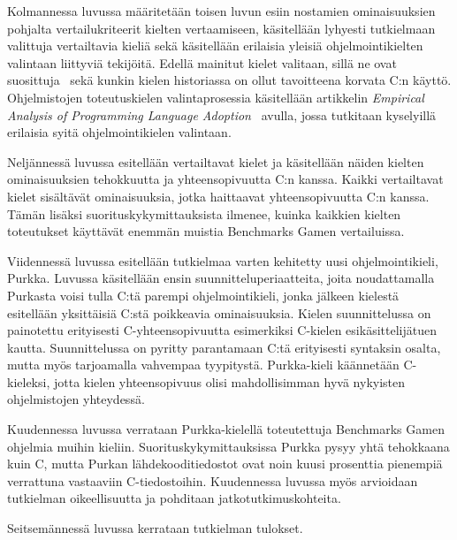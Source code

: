 Kolmannessa luvussa määritetään toisen luvun esiin nostamien ominaisuuksien
pohjalta vertailukriteerit kielten vertaamiseen, käsitellään lyhyesti
tutkielmaan valittuja vertailtavia kieliä sekä käsitellään erilaisia yleisiä
ohjelmointikielten valintaan liittyviä tekijöitä. Edellä mainitut kielet
valitaan, sillä ne ovat suosittuja~\citep{tiobe} sekä kunkin kielen historiassa
on ollut tavoitteena korvata C:n käyttö. Ohjelmistojen toteutuskielen
valintaprosessia käsitellään artikkelin \emph{Empirical Analysis of Programming
Language Adoption}~\citep{empiricalpopularity} avulla, jossa tutkitaan
kyselyillä erilaisia syitä ohjelmointikielen valintaan.

Neljännessä luvussa esitellään vertailtavat kielet ja käsitellään näiden
kielten ominaisuuksien tehokkuutta ja yhteensopivuutta C:n kanssa. Kaikki
vertailtavat kielet sisältävät ominaisuuksia, jotka haittaavat yhteensopivuutta
C:n kanssa. Tämän lisäksi suorituskykymittauksista ilmenee, kuinka kaikkien
kielten toteutukset käyttävät enemmän muistia Benchmarks Gamen vertailuissa.

Viidennessä luvussa esitellään tutkielmaa varten kehitetty uusi
ohjelmointikieli, Purkka. Luvussa käsitellään ensin suunnitteluperiaatteita,
joita noudattamalla Purkasta voisi tulla C:tä parempi ohjelmointikieli, jonka
jälkeen kielestä esitellään yksittäisiä C:stä poikkeavia ominaisuuksia. Kielen
suunnittelussa on painotettu erityisesti C-yhteensopivuutta esimerkiksi
C-kielen esikäsittelijätuen kautta. Suunnittelussa on pyritty parantamaan C:tä
erityisesti syntaksin osalta, mutta myös tarjoamalla vahvempaa tyypitystä.
Purkka-kieli käännetään C-kieleksi, jotta kielen yhteensopivuus olisi
mahdollisimman hyvä nykyisten ohjelmistojen yhteydessä.

Kuudennessa luvussa verrataan Purkka-kielellä toteutettuja Benchmarks Gamen
ohjelmia muihin kieliin. Suorituskykymittauksissa Purkka pysyy yhtä tehokkaana
kuin C, mutta Purkan lähdekooditiedostot ovat noin kuusi prosenttia pienempiä
verrattuna vastaaviin C-tiedostoihin. Kuudennessa luvussa myös arvioidaan
tutkielman oikeellisuutta ja pohditaan jatkotutkimuskohteita.

Seitsemännessä luvussa kerrataan tutkielman tulokset.
